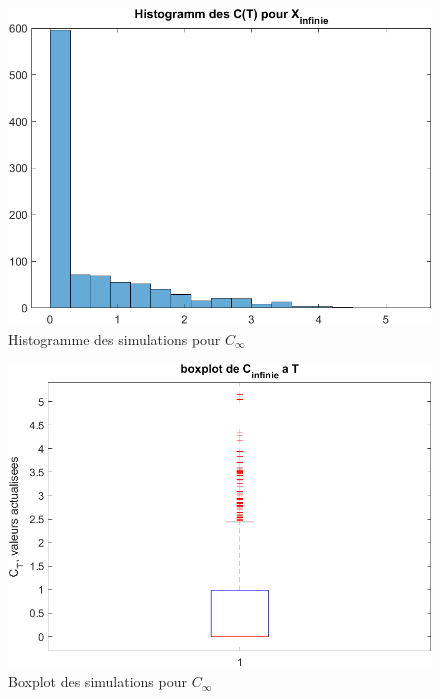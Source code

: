 \documentclass[a4paper,12pt]{scrartcl}
\begin{document}
\begin{figure}[h!]
  \begin{center}
    \includegraphics[width=14cm]{"graphiques/hist_C_inf.png"}
    \caption{Histogramme des simulations pour $C_{\infty}$}
    \label{fig:hist_C_inf}
  \end{center}
\end{figure}

\begin{figure}[h!]
  \begin{center}
    \includegraphics[width=14cm]{"graphiques/box_C_inf.png"}
    \caption{Boxplot des simulations pour $C_{\infty}$}
    \label{fig:box_C_inf}
  \end{center}
\end{figure}
\end{document}
